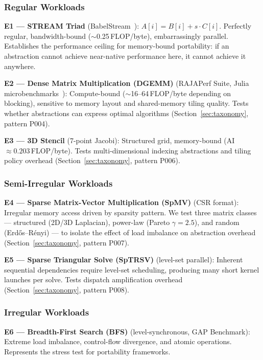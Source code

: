 \subsubsection{Regular Workloads}

\textbf{E1 --- STREAM Triad} (BabelStream~\cite{Deakin2019}):
$A[i] = B[i] + s \cdot C[i]$. Perfectly regular, bandwidth-bound
($\sim$0.25\,FLOP/byte), embarrassingly parallel. Establishes the performance
ceiling for memory-bound portability: if an abstraction cannot achieve
near-native performance here, it cannot achieve it anywhere.

\textbf{E2 --- Dense Matrix Multiplication (DGEMM)} (RAJAPerf Suite, Julia
microbenchmarks~\cite{Godoy2023}): Compute-bound ($\sim$16--64\,FLOP/byte
depending on blocking), sensitive to memory layout and shared-memory tiling
quality. Tests whether abstractions can express optimal algorithms
(Section~\ref{sec:taxonomy}, pattern P004).

\textbf{E3 --- 3D Stencil} (7-point Jacobi): Structured grid, memory-bound
(AI $\approx 0.203$\,FLOP/byte). Tests multi-dimensional indexing abstractions
and tiling policy overhead (Section~\ref{sec:taxonomy}, pattern P006).

\subsubsection{Semi-Irregular Workloads}

\textbf{E4 --- Sparse Matrix-Vector Multiplication (SpMV)} (CSR format):
Irregular memory access driven by sparsity pattern. We test three matrix classes
--- structured (2D/3D Laplacian), power-law (Pareto $\gamma = 2.5$), and random
(Erd\H{o}s--R\'enyi) --- to isolate the effect of load imbalance on abstraction
overhead (Section~\ref{sec:taxonomy}, pattern P007).

\textbf{E5 --- Sparse Triangular Solve (SpTRSV)} (level-set parallel):
Inherent sequential dependencies require level-set scheduling, producing many
short kernel launches per solve. Tests dispatch amplification overhead
(Section~\ref{sec:taxonomy}, pattern P008).

\subsubsection{Irregular Workloads}

\textbf{E6 --- Breadth-First Search (BFS)} (level-synchronous, GAP Benchmark):
Extreme load imbalance, control-flow divergence, and atomic operations.
Represents the stress test for portability frameworks.

